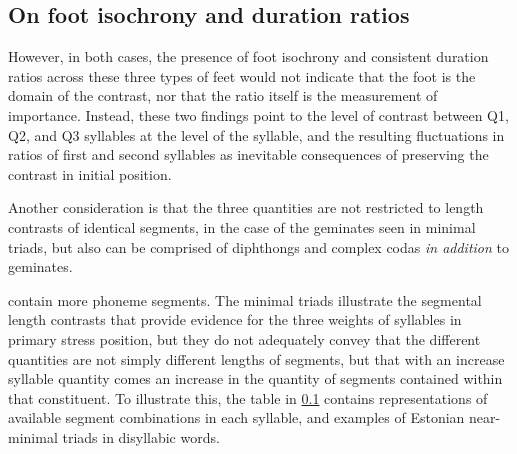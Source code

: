 \subsection{On foot isochrony and duration ratios} 

However, in both cases, the presence of foot isochrony and consistent duration ratios across these three types of feet would not indicate that the foot is the domain of the contrast, nor that the ratio itself is the measurement of importance. Instead, these two findings point to the level of contrast between Q1, Q2, and Q3 syllables at the level of the syllable, and the resulting fluctuations in ratios of first and second syllables as inevitable consequences of preserving the contrast in initial position. 

Another consideration is that the three quantities are not restricted to length contrasts of identical segments, in the case of the geminates seen in minimal triads, but also can be comprised of diphthongs and complex codas {\it in addition} to geminates. 


contain more phoneme segments. The minimal triads illustrate the segmental length contrasts that provide evidence for the three weights of syllables in primary stress position, but they do not adequately convey that the different quantities are not simply different lengths of segments, but that with an increase syllable quantity comes an increase in the quantity of segments contained within that constituent. To illustrate this, the table in \ref{} contains representations of available segment combinations in each syllable, and examples of Estonian near-minimal triads in disyllabic words. 

